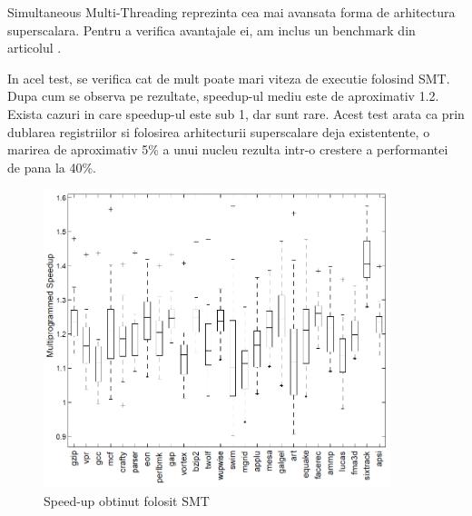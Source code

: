 
Simultaneous Multi-Threading reprezinta cea mai avansata forma de arhitectura superscalara. Pentru
a verifica avantajale ei, am inclus un benchmark din articolul \cite{tuck2003initial}.

In acel test, se verifica cat de mult poate mari viteza de executie folosind SMT. Dupa cum se
observa pe rezultate, speedup-ul mediu este de aproximativ 1.2. Exista cazuri in care speedup-ul
este sub 1, dar sunt rare. Acest test arata ca prin dublarea registriilor si folosirea arhitecturii
superscalare deja existentente, o marirea de aproximativ 5\% a unui nucleu rezulta intr-o crestere
a performantei de pana la 40\%.

\begin{figure}[ht] \centering
\includegraphics[width=0.9\textwidth]{img/smt.png}
\caption{Speed-up obtinut folosit SMT} \end{figure}

